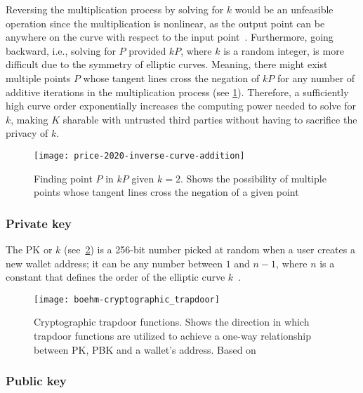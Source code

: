Reversing the multiplication process by solving for $k$ would be an unfeasible operation since the multiplication is nonlinear, as the output point can be anywhere on the curve with respect to the input point~\autocite{price_bitcoins_2020}.
Furthermore, going backward, i.e., solving for $P$ provided $kP$, where $k$ is a random integer, is more difficult due to the symmetry of elliptic curves.
Meaning, there might exist multiple points $P$ whose tangent lines cross the negation of $kP$ for any number of additive iterations in the multiplication process (see \cref{fig:finding-point-p}).
Therefore, a sufficiently high curve order exponentially increases the computing power needed to solve for $k$, making $K$ sharable with untrusted third parties without having to sacrifice the privacy of $k$.

\begin{figure}[H]
    \begin{center}
        \texttt{[image: price-2020-inverse-curve-addition]}
    \end{center}
    \caption[Finding point $P$ in $kP$ given $k=2$]{Finding point $P$ in $kP$ given $k=2$.
    Shows the possibility of multiple points whose tangent lines cross the negation of a given point~\autocite{price_bitcoins_2020}}
    \label{fig:finding-point-p}
\end{figure}

\subsubsection{Private key}\label{subsubsec:private-key}

The \gls{PK} or $k$ (see~\cref{fig:elliptic-curve-trapdoor}) is a 256-bit number picked at random when a user creates a new wallet address;
it can be any number between $1$ and $n-1$, where $n$ is a constant that defines the order of the elliptic curve $k$~\autocite[63]{antonopoulos_mastering_2017}.

\begin{figure}[H]
    \texttt{[image: boehm-cryptographic\_trapdoor]}
    \caption[Cryptographic trapdoor functions]{Cryptographic trapdoor functions. Shows the direction in which trapdoor functions are utilized to achieve a one-way relationship between \gls{PK}, \gls{PBK} and a wallet's address. Based on~\textcite[160]{antonopoulos_mastering_2017}}
    \label{fig:elliptic-curve-trapdoor}
\end{figure}

\subsubsection{Public key}\label{subsubsec:public-key}

